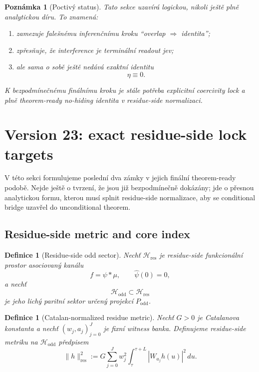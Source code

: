 \documentclass[11pt,a4paper]{article}
\newtheorem{definition}[theorem]{Definice}
\newtheorem{remark}[theorem]{Poznámka}
\begin{document}
\begin{remark}[Poctivý status]
Tato sekce uzavírá logickou, nikoli ještě plně analytickou díru.
To znamená:
\begin{enumerate}[label=\textbf{(\arabic*)}]
    \item zamezuje falešnému inferenčnímu kroku ``overlap \(\Rightarrow\) identita'';
    \item zpřesňuje, že interference je terminální readout jev;
    \item ale sama o sobě ještě nedává exaktní identitu
    \[
    \eta\equiv 0.
    \]
\end{enumerate}
K bezpodmínečnému finálnímu kroku je stále potřeba explicitní coercivity lock a plně theorem-ready
no-hiding identita v residue-side normalizaci.
\end{remark}



\section{Version 23: exact residue-side lock targets}

V této sekci formulujeme poslední dva zámky v jejich finální theorem-ready podobě.
Nejde ještě o tvrzení, že jsou již bezpodmínečně dokázány; jde o přesnou analytickou formu,
kterou musí splnit residue-side normalizace, aby se conditional bridge uzavřel do
unconditional theorem.

\subsection*{Residue-side metric and core index}

\begin{definition}[Residue-side odd sector]
Nechť \(\mathcal H_{\mathrm{res}}\) je residue-side funkcionální prostor asociovaný kanálu
\[
f=\psi * \mu,
\qquad
\widehat{\psi}(0)=0,
\]
a nechť
\[
\mathcal H_{\mathrm{odd}}\subset \mathcal H_{\mathrm{res}}
\]
je jeho lichý paritní sektor určený projekcí \(P_{\mathrm{odd}}\).
\end{definition}

\begin{definition}[Catalan-normalized residue metric]
Nechť \(G>0\) je Catalanova konstanta a nechť \((w_j,a_j)_{j=0}^{J}\) je fixní witness banka.
Definujeme residue-side metriku na \(\mathcal H_{\mathrm{odd}}\) předpisem
\[
\|h\|_{\mathrm{res}}^2
:=
G\sum_{j=0}^{J} w_j^2
\int_{\tau}^{\tau+L} |W_{a_j}h(u)|^2\,du.
\]
\end{definition}
\end{document}
